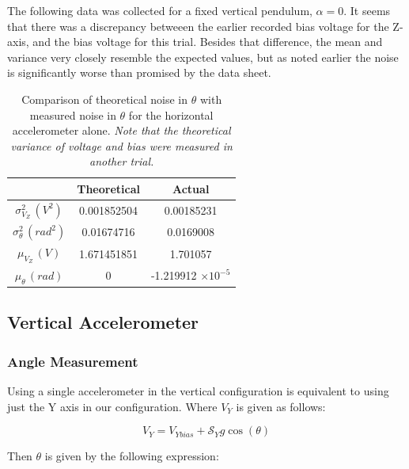 \documentclass{article}
\theoremstyle{plain}
\theoremstyle{definition}
\theoremstyle{remark}
\newcommand{\Sens}{\mathcal{S}}
\providecommand{\e}[1]{\ensuremath{\times 10^{#1}}}
\begin{document}
The following data was collected for a fixed vertical pendulum, $\alpha = 0$.  It seems that there was a discrepancy betweeen the earlier recorded bias voltage for the Z-axis, and the bias voltage for this trial.  Besides that difference, the mean and variance very closely resemble the expected values, but as noted earlier the noise is significantly worse than promised by the data sheet.  

\begin{table}
\begin{center}
    \begin{tabular}{|c|c|c|}
        \hline
        ~                   & Theoretical  & Actual \\ \hline
        $\sigma^2_{V_{Z}} \, (V^2)$    & 0.001852504            &  0.00185231      \\ 
        $\sigma^2_{\theta} \, (rad^2)$ & 0.01674716            & 0.0169008      \\ 
        $\mu_{V_{Z}} \, (V)$       & 1.671451851            &  1.701057      \\ 
        $\mu_{\theta} \, (rad)$      & 0            &  -1.219912 \e{-5}     \\
        \hline
    \end{tabular}
\caption{Comparison of theoretical noise in $\theta$ with measured noise in $\theta$ for the horizontal accelerometer alone. \emph{Note that the theoretical variance of voltage and bias were measured in another trial.}}
\label{Noise_horizontal_T}
\end{center}
\end{table}

\subsection{Vertical Accelerometer}

\subsubsection{Angle Measurement}

Using a single accelerometer in the vertical configuration is equivalent to using just the Y axis in our configuration.  Where $V_{Y}$ is given as follows:

$$ V_{Y} = V_{Ybias} + \Sens_{Y} g \cos(\theta) $$

Then $\theta$ is given by the following expression:
\end{document}
